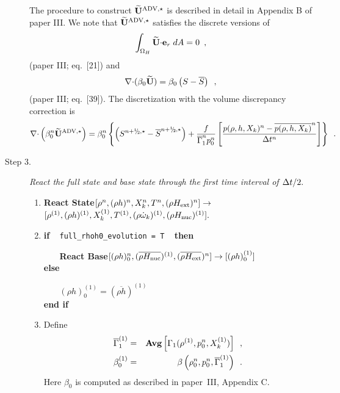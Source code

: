 \begin{description}
The procedure to construct $\widetilde{\mathbf{U}}^{\mathrm{ADV},\star}$ is described in detail in Appendix B of paper III.
We note that  $\widetilde{\mathbf{U}}^{\mathrm{ADV},\star}$ satisfies the discrete versions of 
\begin{equation}
\int_{\Omega_H} \widetilde{{\bf U}} \mathbf{\cdot} \mathbf{e}_r \; dA = 0 \label{eq:udoterzero} \enskip ,
\end{equation}
(paper III; eq.~[21])
and
\begin{equation}
\mathbf{\nabla} \mathbf{\cdot} (\beta_0 \widetilde{{\bf U}} )  = \beta_0 \left(S - \overline{S} \right )\enskip ,
\label{eq:tildeconstraint}
\end{equation}
(paper III; eq.~[39]).  The discretization with the volume discrepancy correction is
\begin{equation}
\nablab \cdotb \left(\beta_0^n \uadvone\right) = 
\beta_0^n \left\{ \left(S^{\nph,\star} - \overline{S}^{\nph,\star}\right)
+ \frac{f}{\gammabar^n p_0^n}
\left[\frac{p(\rho,h,X_k)^n - \overline{p(\rho,h,X_k)}^n}{\Delta t^n}\right]\right\} \enskip .
\end{equation}

\item[Step 3.] {\em React the full state and base state through the first time 
interval of $\Delta t / 2.$}

\begin{enumerate}
\renewcommand{\theenumi}{{\bf \alph{enumi}}}

\item {\bf React State}$[\rho^n, (\rho h)^n, X_k^n, T^n, (\rho{H_{\rm ext}})^n]
                   \rightarrow$ $[ \rho^{(1)}, (\rho h)^{(1)}, X_k^{(1)}, T^{(1)},
                                  (\rho \dot{\omega}_k)^{(1)}, (\rho {H_{\rm nuc}})^{(1)} ].$  

\item {\bf if} ~ {\tt full\_rhoh0\_evolution = T} ~ {\bf then}

~~~ {\bf React Base}$[(\rho h)_0^n,(\overline{\rho {H_{\rm nuc}}})^{(1)},(\overline{\rho{H_{\rm ext}}})^n] \rightarrow [(\rho h)_0^{(1)}]$ \\
{\bf else}

~~~ $(\rho h)_0^{(1)} = (\overline{\rho h})^{(1)}$\\
{\bf end if}
\item Define
\begin{eqnarray}
\overline{\Gamma}_1^{(1)}        &=& {\rm{\bf Avg}} \left[ \Gamma_1(\rho^{(1)}, p_0^{n}, X_k^{(1)}) \right] \enskip , \\
 {\beta   }_0^{(1)}    &=& \beta   \left(\rho_0^{n}, p_0^{n}, \overline{\Gamma}_1^{(1)}\right) \enskip .
\end{eqnarray}
Here $\beta_0$ is computed as described in paper~III, Appendix C.


\end{enumerate}
\end{description}
